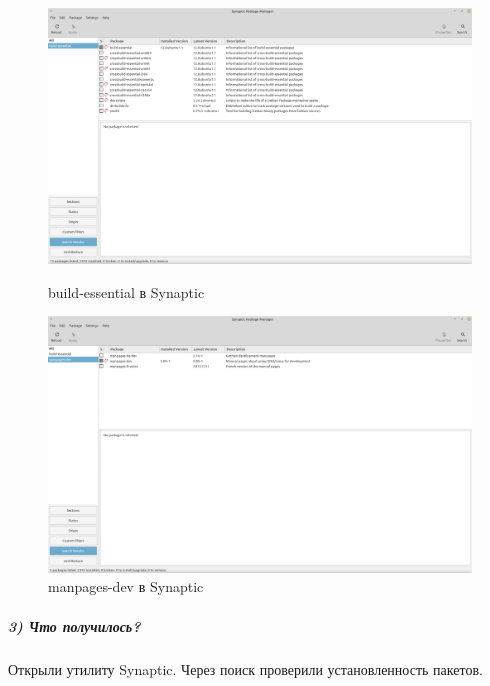 \begin{figure}[!htp]
    \begin{minipage}{0.49\textwidth}
        \centering
        \includegraphics[width=\linewidth]
            {../input/task-2/2/build-essential.png}
        \caption{build-essential в Synaptic}
        \label{fig:build-essential}
    \end{minipage}
    \begin{minipage}{0.49\textwidth}
        \centering
        \includegraphics[width=\linewidth]
            {../input/task-2/2/manpages-dev.png}
        \caption{manpages-dev в Synaptic}
        \label{fig:manpages-dev}
    \end{minipage}
\end{figure}

\subparagraph{3) Что получилось?}

Открыли утилиту Synaptic. Через поиск проверили установленность пакетов.
